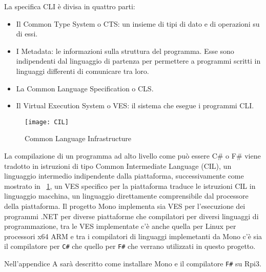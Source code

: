 La specifica CLI è divisa in quattro parti:
\begin{itemize}
\item Il Common Type System o CTS: un insieme di tipi di dato e di operazioni su di essi.
\item I Metadata: le informazioni sulla struttura del programma. Esse sono indipendenti dal linguaggio di partenza per permettere a programmi scritti in linguaggi differenti di comunicare tra loro.
\item La Common Language Specification o CLS.
\item Il Virtual Execution System o VES: il sistema che esegue i programmi CLI.
\end{itemize}
\begin{figure}[htbp!] 
	\centering    
	\texttt{[image: CIL]}
	\caption[CIL]{Common Language Infrastructure}
	\label{fig:CIL}
\end{figure}
La compilazione di un programma ad alto livello come può essere C# o F# viene tradotto in istruzioni di tipo Common Intermediate Language (CIL), un linguaggio intermedio indipendente dalla piattaforma, successivamente
come mostrato in \figurename~\ref{fig:CIL},  un VES specifico per la piattaforma traduce le istruzioni CIL in linguaggio macchina, un linguaggio direttamente comprensibile dal processore della piattaforma.
Il progetto Mono implementa sia VES per l'esecuzione dei programmi .NET per diverse piattaforme che compilatori per diversi linguaggi di programmazione, tra le VES implementate c'è anche quella per Linux per processori x64 ARM e tra i compilatori di linguaggi implemetanti da Mono c'è sia il compilatore per \texttt{C\#} che quello per \texttt{F\#} che verrano utilizzati in questo progetto.

Nell'appendice A sarà  descritto come installare Mono e il compilatore \texttt{F\#} su Rpi3.

